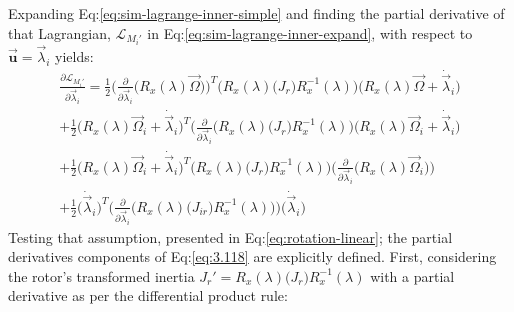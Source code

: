 Expanding Eq:\ref{eq:sim-lagrange-inner-simple} and finding the partial derivative of that Lagrangian, $\mathcal{L}_{M_i'}$ in Eq:\ref{eq:sim-lagrange-inner-expand}, with respect to $\vec{\mathbf{u}}=\vec{\lambda}_i$ yields:
\begin{multline}\label{eq:3.118}
\frac{\partial\mathcal{L}_{M_i'}}{\partial\vec{\lambda}_i}=\frac{1}{2}\bigg(\frac{\partial}{\partial\vec{\lambda}_i}\Big(R_x(\lambda)\vec{\Omega}\Big)\bigg)^T\Big(R_x(\lambda)\big(J_r\big)R_x^{-1}(\lambda)\Big)\Big(R_x(\lambda)\vec{\Omega}+\dot{\vec{\lambda}}_i\Big)
\\
+\frac{1}{2}\Big(R_x(\lambda)\vec{\Omega}_i+\dot{\vec{\lambda}}_i\Big)^T\bigg(\frac{\partial}{\partial\vec{\lambda}_i}\Big(R_x(\lambda)\big(J_r\big)R_x^{-1}(\lambda)\Big)\bigg(R_x(\lambda)\vec{\Omega}_i+\dot{\vec{\lambda}}_i\Big)
\\
+\frac{1}{2}\Big(R_x(\lambda)\vec{\Omega}_i+\dot{\vec{\lambda}}_i\Big)^T\Big(R_x(\lambda)\big(J_r\big)R_x^{-1}(\lambda)\Big)\bigg(\frac{\partial}{\partial\vec{\lambda}_i}\Big(R_x(\lambda)\vec{\Omega}_i\Big)\bigg)
\\
+\frac{1}{2}\Big(\dot{\vec{\lambda}}_i\Big)^T\bigg(\frac{\partial}{\partial\vec{\lambda}_i}\Big(R_x(\lambda)\big(J_{ir}\big)R_x^{-1}(\lambda)\Big)\bigg)\Big(\dot{\vec{\lambda}}_i\Big)
\end{multline}
Testing that assumption, presented in Eq:\ref{eq:rotation-linear}; the partial derivatives components of Eq:\ref{eq:3.118} are explicitly defined. First, considering the rotor's transformed inertia $J_r'=R_x(\lambda)\big(J_r\big)R_x^{-1}(\lambda)$ with a partial derivative as per the differential product rule:
